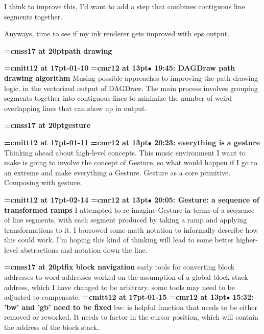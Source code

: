 I think to improve this, I'd want to add a step that combines contiguous line segments together.
\par

Anyways, time to see if my ink renderer gets improved with eps output.
\par

{\medskip\noindent\bf\font\titlefont=cmss17 at 20pt\titlefont path drawing}\medskip

{\medskip\noindent\bf\font\titlefont=cmitt12 at 17pt-01-10}\medskip
{\smallskip\noindent\bf\font\titlefont=cmr12 at 13pt\titlefont $\bullet$ 19:45: DAGDraw path drawing algorithm}\smallskip
Musing possible approaches to improving the path drawing logic. in the vectorized output of DAGDraw. The main process involves grouping segments together into contiguous lines to minimize the number of weird overlapping lines that can show up in output.
\par

{\medskip\noindent\bf\font\titlefont=cmss17 at 20pt\titlefont gesture}\medskip

{\medskip\noindent\bf\font\titlefont=cmitt12 at 17pt-01-11}\medskip
{\smallskip\noindent\bf\font\titlefont=cmr12 at 13pt\titlefont $\bullet$ 20:23: everything is a gesture}\smallskip
Thinking ahead about high-level concepts. This music environment I want to make is going to involve the concept of Gesture, so what would happen if I go to an extreme and make everything a Gesture. Gesture as a core primitive. Composing with gesture.
\par

{\medskip\noindent\bf\font\titlefont=cmitt12 at 17pt-02-14}\medskip
{\smallskip\noindent\bf\font\titlefont=cmr12 at 13pt\titlefont $\bullet$ 20:05: Gesture: a sequence of transformed ramps}\smallskip
I attempted to re-imagine Gesture in terms of a sequence of line segments, with each segment produced by taking a ramp and applying transformations to it. I borrowed some math notation to informally describe how this could work. I'm hoping this kind of thinking will lead to some better higher-level abstractions and notation down the line.
\par

{\medskip\noindent\bf\font\titlefont=cmss17 at 20pt\titlefont fix block navigation}\medskip
early tools for converting block addresses to word addresses
worked on the assumption of a global block stack address,
which I have changed to be arbitrary.
some tools may need to be adjusted to compensate.
{\medskip\noindent\bf\font\titlefont=cmitt12 at 17pt-01-15}\medskip
{\smallskip\noindent\bf\font\titlefont=cmr12 at 13pt\titlefont $\bullet$ 15:32: 'bw' and 'gb' need to be fixed}\smallskip
bw: is helpful function that needs to be either removed or reworked. It needs to factor in the cursor position, which will contain the address of the block stack.
\par

